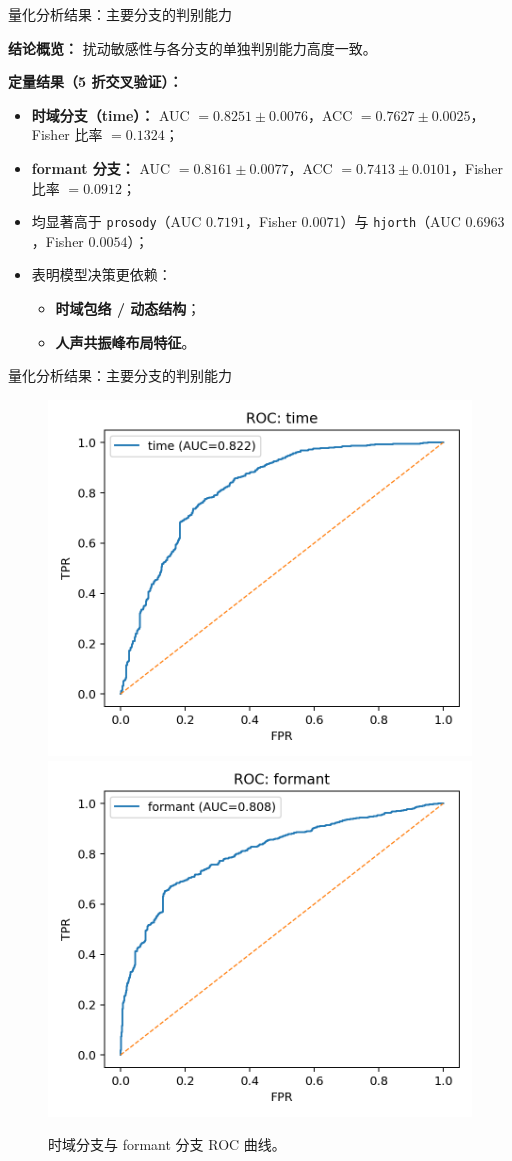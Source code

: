 \documentclass[aspectratio=169]{beamer}
\begin{document}
\begin{frame}{量化分析结果：主要分支的判别能力}

\textbf{结论概览：}
扰动敏感性与各分支的单独判别能力高度一致。

\vspace{0.6em}
\textbf{定量结果（5 折交叉验证）：}
\begin{itemize}
  \item \textbf{时域分支（time）：}  
    AUC $=0.8251\!\pm\!0.0076$，ACC $=0.7627\!\pm\!0.0025$，Fisher 比率 $=0.1324$；
  \item \textbf{formant 分支：}  
    AUC $=0.8161\!\pm\!0.0077$，ACC $=0.7413\!\pm\!0.0101$，Fisher 比率 $=0.0912$；
  \item 均显著高于 \texttt{prosody}（AUC $0.7191$，Fisher $0.0071$）与  
        \texttt{hjorth}（AUC $0.6963$，Fisher $0.0054$）；
  \item 表明模型决策更依赖：
    \begin{itemize}
      \item \textbf{时域包络 / 动态结构}；
      \item \textbf{人声共振峰布局特征}。
    \end{itemize}
\end{itemize}

\end{frame}

\begin{frame}{量化分析结果：主要分支的判别能力}
\begin{figure}
  \centering
  \includegraphics[width=0.45\linewidth]{images_in_paper/roc_time.png}
  \hfill
  \includegraphics[width=0.45\linewidth]{images_in_paper/roc_formant.png}
  \caption{时域分支与 formant 分支 ROC 曲线。}
  \label{fig:roc}
\end{figure}

\end{frame}
\end{document}
